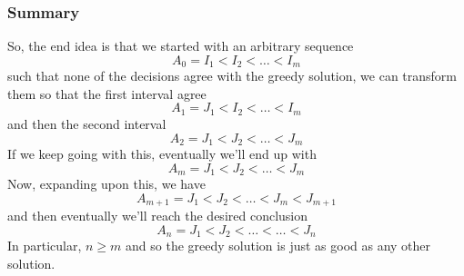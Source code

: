 \documentclass[letterpaper]{article}
\begin{document}
\subsubsection{Summary}
So, the end idea is that we started with an arbitrary sequence
\[A_0 = I_1 < I_2 < \dots < I_m\]
such that none of the decisions agree with the greedy solution, we can transform them so that the first interval agree 
\[A_1 = J_1 < I_2 < \dots < I_m\]
and then the second interval 
\[A_2 = J_1 < J_2 < \dots < J_m\]
If we keep going with this, eventually we'll end up with 
\[A_m = J_1 < J_2 < \dots < J_m\]
Now, expanding upon this, we have 
\[A_{m + 1} = J_1 < J_2 < \dots < J_m < J_{m + 1}\]
and then eventually we'll reach the desired conclusion
\[A_n = J_1 < J_2 < \dots < \dots < J_n\]
In particular, $n \geq m$ and so the greedy solution is just as good as any other solution. 
\end{document}
